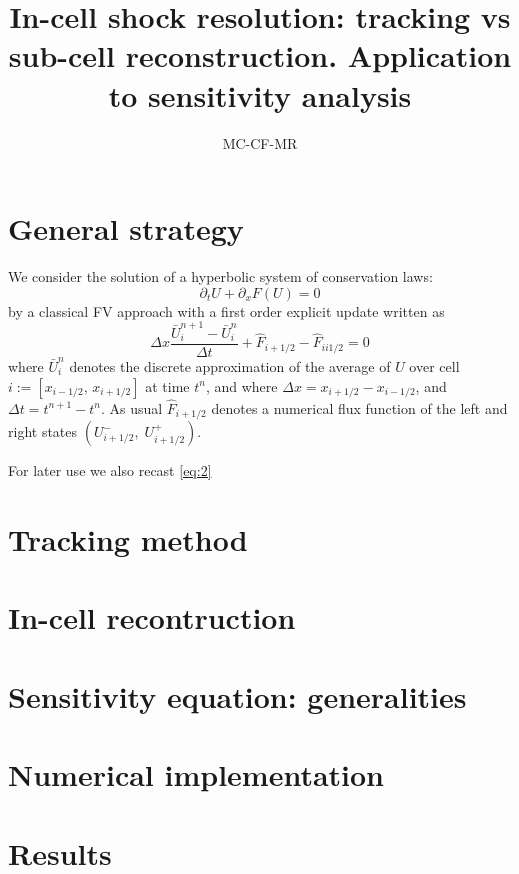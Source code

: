 \documentclass[10pt]{article}
\title{In-cell shock resolution: tracking vs sub-cell reconstruction. Application to sensitivity analysis}
\author{MC-CF-MR}
\begin{document}
\maketitle
\tableofcontents


\section{General strategy}

We consider the solution of a hyperbolic system of conservation laws: 
 \begin{equation}\label{eq:1}
\partial_tU+ \partial_x F(U) =0
   \end{equation}
by a classical FV approach with a first order explicit update written as
 \begin{equation}\label{eq:2}
\Delta x\dfrac{\bar U^{n+1}_i-\bar U^{n}_i}{\Delta t}+ \hat F_{i+1/2}  -  \hat F_{ii1/2} =0
   \end{equation}
   where   $\bar U_i^n$ denotes  the discrete approximation of the average of $U$ over cell $i:=[x_{i-1/2},\,x_{i+1/2}]$ at time $t^n$,
   and where $\Delta x =x_{i+1/2}-x_{i-1/2}$, and $\Delta t=t^{n+1}-t^n$.
As usual $\hat F_{i+1/2} $ denotes a numerical flux function of the left and right states $(U_{i+1/2}^-,\;U_{i+1/2}^+)$.

For later use we also recast  \eqref{eq:2} 
 

\section{Tracking method}
\section{In-cell recontruction}
 
\section{Sensitivity equation: generalities}

\section{Numerical implementation}

\section{Results}


 

 
\end{document}
